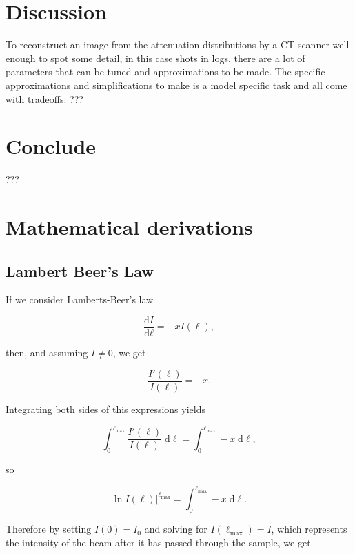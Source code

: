 \documentclass{article}
\newcommand{\diff}[2]{\frac{\text{d} #1}{\text{d} #2}}
\begin{document}
\section{Discussion}
To reconstruct an image from the attenuation distributions by a CT-scanner well enough to spot some detail, in this case shots in logs, there are a lot of parameters that can be tuned and approximations to be made. The specific approximations and simplifications to make is a model specific task and all come with tradeoffs.
???


\section{Conclude}
???






\newpage
\appendix
\section{Mathematical derivations}
\subsection{Lambert Beer's Law}\label{appendix:lambert-beers-law}
If we consider Lamberts-Beer's law

\begin{equation}\label{eq:lamberts-beer}
    \diff{I}{\ell} = -x I(\ell),
\end{equation}

then, and assuming $I \neq 0$, we get

\begin{equation}
    \frac{I'(\ell)}{I(\ell)} = -x.
\end{equation}

Integrating both sides of this expressions yields

\begin{equation}
    \int_{0}^{\ell_{\max}} \frac{I'(\ell)}{I(\ell)} \; \mathrm{d}\ell = \int_{0}^{\ell_{\max}} -x \; \mathrm{d}\ell,
\end{equation}

so

\begin{equation}
    \ln{I(\ell)} \big|_{0}^{\ell_{\max}} = \int_{0}^{\ell_{\max}} -x \; \mathrm{d}\ell.
\end{equation}

Therefore by setting $I(0) = I_0$ and solving for $I(\ell_{\max}) = I$, which represents the intensity of the beam after it has passed through the sample, we get
\end{document}
